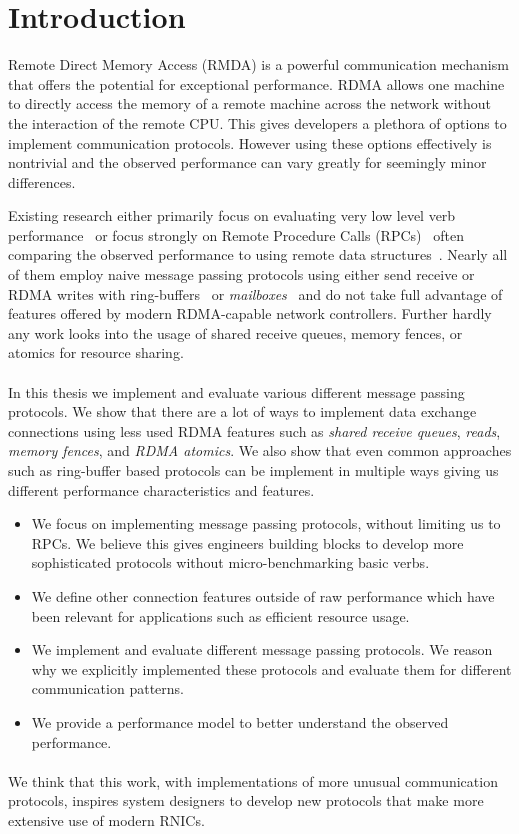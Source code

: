 \section{Introduction}

Remote Direct Memory Access (RMDA) is a powerful communication mechanism that offers the potential for exceptional performance.
RDMA allows one machine to directly access the memory of a remote machine across the network without the interaction of the 
remote CPU. This gives developers a plethora of options to implement communication protocols. However using these options 
effectively is nontrivial and the observed performance can vary greatly for seemingly minor differences. 

Existing research either primarily focus on evaluating very low level verb performance~\cite{anuj-guide} or focus strongly on 
Remote Procedure Calls (RPCs)~\cite{eval-mpp} often comparing the observed performance to using remote data 
structures~\cite{fasst, rpc-vs-rdma}. Nearly all of them employ naive message passing protocols using either 
send receive or RDMA writes with ring-buffers~\cite{rdma-fast-dbms} or \emph{mailboxes}~\cite{ziegler2020rdma} and do not 
take full advantage of 
features offered by modern RDMA-capable network controllers. Further hardly any work looks into the usage of shared receive
queues, memory fences, or atomics for resource sharing.

\paragraph{}In this thesis we implement and evaluate various different message passing protocols. We show that there are a 
lot of ways to implement data exchange connections using less used RDMA features such as \emph{shared receive queues}, \emph{reads}, 
\emph{memory fences}, and \emph{RDMA atomics}. We also show that even common approaches such as ring-buffer based protocols 
can be implement in multiple ways giving us different performance characteristics and features.

\begin{itemize}
  \item We focus on implementing message passing protocols, without limiting us to RPCs. We believe this gives engineers 
    building blocks to develop more sophisticated protocols without micro-benchmarking basic verbs.
  \item We define other connection features outside of raw performance which have been relevant for applications such as 
    efficient resource usage.
  \item We implement and evaluate different message passing protocols. We reason why we explicitly implemented these protocols
    and evaluate them for different communication patterns.
  \item We provide a performance model to better understand the observed performance.
\end{itemize}

\paragraph{}We think that this work, with 
implementations of more unusual communication protocols, inspires system designers to develop 
new protocols that make more extensive use of modern RNICs.


